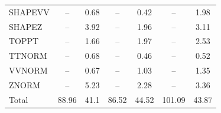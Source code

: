 \begin{table}[H]
\begin{center}
\begin{footnotesize}
\begin{tabular}{lcccccc}
				SHAPEVV & -- &  0.68 & -- &  0.42 & -- &  1.98 \\
				SHAPEZ & -- &  3.92 & -- &  1.96 & -- &  3.11 \\
				TOPPT & -- &  1.66 & -- &  1.97 & -- &  2.53 \\
				TTNORM & -- &  0.68 & -- &  0.46 & -- &  0.52 \\
				VVNORM & -- &  0.67 & -- &  1.03 & -- &  1.35 \\
				ZNORM & -- &  5.23 & -- &  2.28 & -- &  3.36 \\
				Total &  88.96  &  41.1 &  86.52  &  44.52 &  101.09  &  43.87 \\ \hline \hline
			\end{tabular}
			\label{tab:SysUncertainties_2500}
        \end{footnotesize}
	\end{center}
\end{table}


